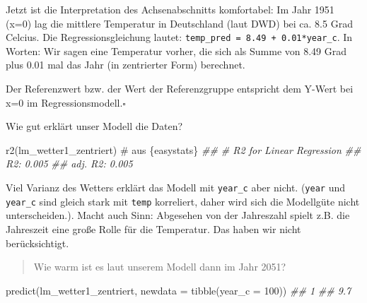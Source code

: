 \documentclass[
  letterpaper,
]{scrbook}
\newenvironment{Shaded}{\begin{snugshade}}{\end{snugshade}}
\newcommand{\AttributeTok}[1]{\textcolor[rgb]{0.40,0.45,0.13}{#1}}
\newcommand{\CommentTok}[1]{\textcolor[rgb]{0.37,0.37,0.37}{#1}}
\newcommand{\DecValTok}[1]{\textcolor[rgb]{0.68,0.00,0.00}{#1}}
\newcommand{\DocumentationTok}[1]{\textcolor[rgb]{0.37,0.37,0.37}{\textit{#1}}}
\newcommand{\FunctionTok}[1]{\textcolor[rgb]{0.28,0.35,0.67}{#1}}
\newcommand{\NormalTok}[1]{\textcolor[rgb]{0.00,0.23,0.31}{#1}}
\theoremstyle{definition}
\theoremstyle{definition}
\theoremstyle{definition}
\theoremstyle{remark}
\begin{document}
Jetzt ist die Interpretation des Achsenabschnitts komfortabel: Im Jahr
1951 (x=0) lag die mittlere Temperatur in Deutschland (laut DWD) bei ca.
8.5 Grad Celcius. Die Regressionsgleichung lautet:
\texttt{temp\_pred\ =\ 8.49\ +\ 0.01*year\_c}. In Worten: Wir sagen eine
Temperatur vorher, die sich als Summe von 8.49 Grad plus 0.01 mal das
Jahr (in zentrierter Form) berechnet.

\begin{tcolorbox}[enhanced jigsaw, colbacktitle=quarto-callout-important-color!10!white, coltitle=black, bottomrule=.15mm, rightrule=.15mm, arc=.35mm, toptitle=1mm, colframe=quarto-callout-important-color-frame, opacitybacktitle=0.6, left=2mm, leftrule=.75mm, breakable, opacityback=0, bottomtitle=1mm, titlerule=0mm, title=\textcolor{quarto-callout-important-color}{\faExclamation}\hspace{0.5em}{Referenzwert entspricht Null}, colback=white, toprule=.15mm]

Der Referenzwert bzw. der Wert der Referenzgruppe entspricht dem Y-Wert
bei x=0 im Regressionsmodell.\(\square\)

\end{tcolorbox}

Wie gut erklärt unser Modell die Daten?

\begin{Shaded}
\begin{Highlighting}[]
\FunctionTok{r2}\NormalTok{(lm\_wetter1\_zentriert)  }\CommentTok{\# aus \textasciigrave{}\{easystats\}\textasciigrave{}}
\DocumentationTok{\#\# \# R2 for Linear Regression}
\DocumentationTok{\#\#        R2: 0.005}
\DocumentationTok{\#\#   adj. R2: 0.005}
\end{Highlighting}
\end{Shaded}

Viel Varianz des Wetters erklärt das Modell mit \texttt{year\_c} aber
nicht. (\texttt{year} und \texttt{year\_c} sind gleich stark mit
\texttt{temp} korreliert, daher wird sich die Modellgüte nicht
unterscheiden.). Macht auch Sinn: Abgesehen von der Jahreszahl spielt
z.B. die Jahreszeit eine große Rolle für die Temperatur. Das haben wir
nicht berücksichtigt.

\begin{quote}
{} Wie warm ist es laut unserem Modell dann im Jahr 2051?
\end{quote}

\begin{Shaded}
\begin{Highlighting}[]
\FunctionTok{predict}\NormalTok{(lm\_wetter1\_zentriert, }\AttributeTok{newdata =} \FunctionTok{tibble}\NormalTok{(}\AttributeTok{year\_c =} \DecValTok{100}\NormalTok{))}
\DocumentationTok{\#\#   1 }
\DocumentationTok{\#\# 9.7}
\end{Highlighting}
\end{Shaded}
\end{document}
